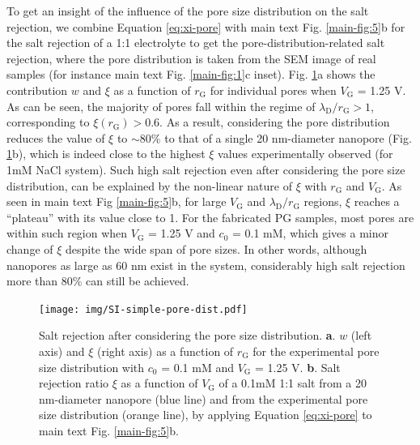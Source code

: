 \documentclass[manuscript=suppinfo,email=true, hyperref=true, keywords=false]{achemso}
\newcommand{\Fig}{Fig.}
\begin{document}
To get an insight of the influence of the pore size distribution on
the salt rejection, we combine Equation \ref{eq:xi-pore} with main
text \Fig{} \ref{main-fig:5}b for the salt rejection of a 1:1
electrolyte to get the pore-distribution-related salt rejection, where
the pore distribution is taken from the SEM image of real samples (for
instance main text \Fig{} \ref{main-fig:1}c inset). \Fig{}
\ref{fig:simple-rect-pore}a shows the contribution $w$ and $\xi$ as
a function of $r_{\mathrm{G}}$ for individual pores when
$V_{\mathrm{G}}$ = 1.25 V. As can be seen, the majority of pores fall
within the regime of $\lambda_{\mathrm{D}} / r_{\mathrm{G}} > 1$,
corresponding to $\xi(r_{\mathrm{G}}) > 0.6$. As a result, considering
the pore distribution reduces the value of $\xi$ to $\sim{}$80\% to
that of a single 20 nm-diameter nanopore (\Fig{}
\ref{fig:simple-rect-pore}b), which is indeed close to the highest
$\xi$ values experimentally observed (for 1mM NaCl system). Such high
salt rejection even after considering the pore size distribution, can
be explained by the non-linear nature of $\xi$ with $r_{\mathrm{G}}$
and $V_{\mathrm{G}}$. As seen in main text Fig{} \ref{main-fig:5}b,
for large $V_{\mathrm{G}}$ and $\lambda_{\mathrm{D}} / r_{\mathrm{G}}$
regions, $\xi$ reaches a ``plateau'' with its value close to 1. For
the fabricated PG samples, most pores are within such region when
$V_{\mathrm{G}}$ = 1.25 V and $c_{0}$ = 0.1 mM, which gives a minor
change of $\xi$ despite the wide span of pore sizes. In other words,
although nanopores as large as 60 nm exist in the system, considerably
high salt rejection more than 80\% can still be achieved.

\begin{figure}[htbp]
  \centering
   \texttt{[image: img/SI-simple-pore-dist.pdf]}
   \caption{Salt rejection after considering the pore size
     distribution. \textbf{a}. $w$ (left axis) and $\xi$ (right axis)
     as a function of $r_{\mathrm{G}}$ for the experimental pore size
     distribution with $c_{0}$ = 0.1 mM and $V_{\mathrm{G}}$ = 1.25 V.
     \textbf{b}. Salt rejection ratio $\xi$ as a function of $V_{\mathrm{G}}$ of a
     0.1mM 1:1 salt from a 20 nm-diameter nanopore (blue line) and
     from the experimental pore size distribution (orange line), by
     applying Equation \ref{eq:xi-pore} to main text \Fig{}
     \ref{main-fig:5}b.}
  \label{fig:simple-rect-pore}
\end{figure}
\end{document}
